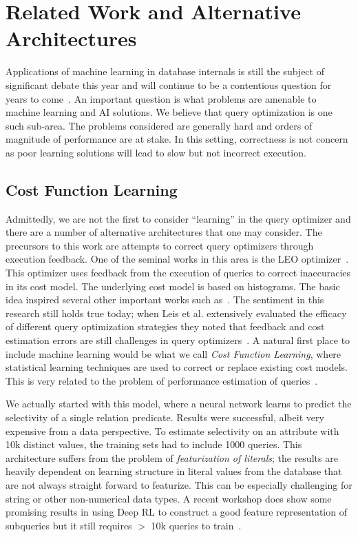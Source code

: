 \section{Related Work and Alternative Architectures}
Applications of machine learning in database internals is still the subject of significant debate this year and will continue to be a contentious question for years to come~\cite{btree, kraska2018case, mitzenmacher2018model, ma2018query}. An important question is what problems are amenable to machine learning and AI solutions. We believe that query optimization is one such sub-area. The problems considered are generally hard and orders of magnitude of performance are at stake. In this setting, correctness is not concern as poor learning solutions will lead to slow but not incorrect execution.

\subsection{Cost Function Learning} 
Admittedly, we are not the first to consider ``learning'' in the query optimizer and there are a number of alternative architectures that one may consider. The precursors to this work are attempts to correct query optimizers through execution feedback.
One of the seminal works in this area is the LEO optimizer~\cite{markl2003leo}. This optimizer uses feedback from the execution of queries to correct inaccuracies in its cost model. The underlying cost model is based on histograms. The basic idea inspired several other important works such as~\cite{chaudhuri2008pay}. The sentiment in this research still holds true today; when Leis et al. extensively evaluated the efficacy of different query optimization strategies they noted that feedback and cost estimation errors are still challenges in query optimizers~\cite{leis2015good}. A natural first place to include machine learning would be what we call \emph{Cost Function Learning}, where statistical learning techniques are used to correct or replace existing cost models. This is very related to the problem of performance estimation of queries~\cite{akdere2012learning, wu2013predicting, wu2013towards}. 

We actually started with this model, where a neural network learns to predict the selectivity of a single relation predicate. Results were successful, albeit very expensive from a data perspective. To estimate selectivity on an attribute with 10k distinct values, the training sets had to include 1000 queries. This architecture suffers from the problem of \emph{featurization of literals}; the results are heavily dependent on learning structure in literal values from the database that are not always straight forward to featurize. This can be especially challenging for string or other non-numerical data types.  A recent workshop does show some promising results in using Deep RL to construct a good feature representation of subqueries but it still requires $>$ 10k queries to train~\cite{ortiz2018learning}. 

